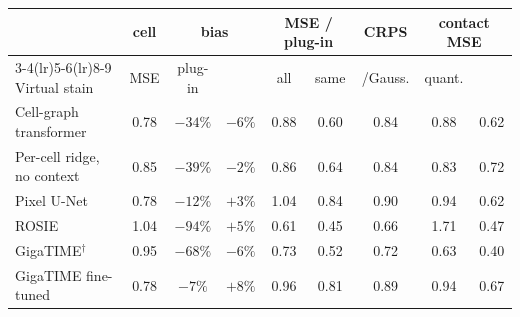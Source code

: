 \begin{tabular}{@{}lcccccccc@{}}
\toprule
 & cell & \multicolumn{2}{c}{bias} & \multicolumn{2}{c}{MSE / plug-in} & CRPS & \multicolumn{2}{c}{contact MSE} \\
\cmidrule(lr){3-4}\cmidrule(lr){5-6}\cmidrule(lr){8-9}
Virtual stain & MSE & plug-in & \method{} & all & same & \method{}/Gauss. & quant. & \method{} \\
\midrule
Cell-graph transformer & 0.78 & $-34\%$ & $-6\%$ & 0.88 & 0.60 & 0.84 & 0.88 & 0.62 \\
Per-cell ridge, no context & 0.85 & $-39\%$ & $-2\%$ & 0.86 & 0.64 & 0.84 & 0.83 & 0.72 \\
Pixel U-Net & 0.78 & $-12\%$ & $+3\%$ & 1.04 & 0.84 & 0.90 & 0.94 & 0.62 \\
ROSIE & 1.04 & $-94\%$ & $+5\%$ & 0.61 & 0.45 & 0.66 & 1.71 & 0.47 \\
GigaTIME$^\dagger$ & 0.95 & $-68\%$ & $-6\%$ & 0.73 & 0.52 & 0.72 & 0.63 & 0.40 \\
GigaTIME fine-tuned & 0.78 & $-7\%$ & $+8\%$ & 0.96 & 0.81 & 0.89 & 0.94 & 0.67 \\
\bottomrule
\end{tabular}
